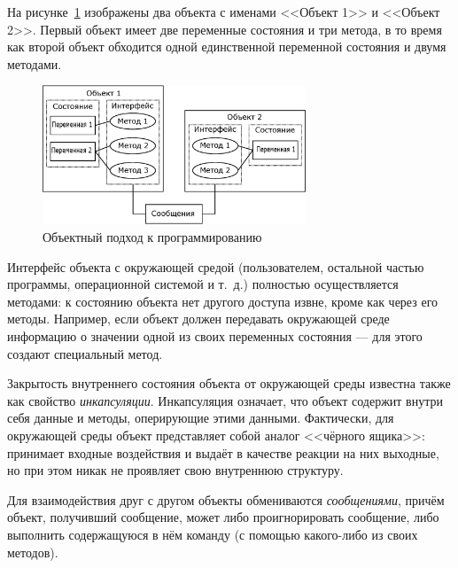 На рисунке~\ref{ch10:refDrawing1} изображены два объекта с именами <<Объект 1>> и <<Объект 2>>. Первый объект имеет две
переменные состояния и три метода, в то время как второй объект обходится одной единственной переменной состояния и
двумя методами.

\begin{figure}[htb]
\begin{center}
\includegraphics[width=0.7\textwidth]{img/ris_10_2}
\caption{Объектный подход к программированию}
\label{ch10:refDrawing1}
\end{center}
\end{figure}


Интерфейс объекта с окружающей средой (пользователем, остальной частью программы, операционной системой и т.~д.)
полностью осуществляется методами: к состоянию объекта нет другого доступа извне, кроме как через его методы. Например,
если объект должен передавать окружающей среде информацию о значении одной из своих переменных состояния --- для этого
создают специальный метод.

Закрытость внутреннего состояния объекта от окружающей среды известна также как свойство
\emph{инкапсуляции}. Инкапсуляция означает, что объект содержит внутри себя данные и
методы, оперирующие этими данными. Фактически, для окружающей среды объект представляет собой аналог <<чёрного ящика>>:
принимает входные воздействия и выдаёт в качестве реакции на них выходные, но при этом никак не проявляет свою
внутреннюю структуру.

Для взаимодействия друг с другом объекты обмениваются \emph{сообщениями}, причём объект, получивший
сообщение, может либо проигнорировать сообщение, либо выполнить содержащуюся в нём команду (с помощью какого-либо из
своих методов).

